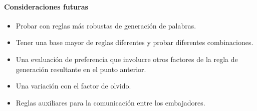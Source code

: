 \documentclass[runningheads]{llncs}
\begin{document}
\paragraph{Consideraciones futuras}
\begin{itemize}
	\item Probar con reglas más robustas de generación de palabras.
	\item Tener una base mayor de reglas diferentes y probar diferentes combinaciones.
	\item Una evaluación de preferencia que involucre otros factores de la regla de generación resultante en el punto anterior.
	\item Una variación con el factor de olvido.
	\item Reglas auxiliares para la comunicación entre los embajadores.
\end{itemize}
%
%
%
% 
% 
%

\end{document}
